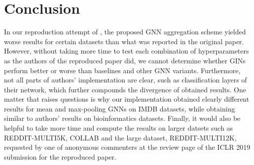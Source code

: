 \documentclass{article} %
\begin{document}
\section{Conclusion}
In our reproduction attempt of \cite{ThePaper}, the proposed GNN aggregation scheme yielded worse results for certain datasets than what was reported in the original paper. However, without taking more time to test each combination of hyperparameters as the authors of the reproduced paper did, we cannot determine whether GINs perform better or worse than baselines and other GNN variants. Furthermore, not all parts of authors' implementation are clear, such as classification layers of their network, which further compounds the divergence of obtained results. One matter that raises questions is why our implementation obtained clearly different results for mean and max-pooling GNNs on IMDB datasets, while obtaining similar to authors' results on bioinformatics datasets. Finally, it would also be helpful to take more time and compute the results on larger datsets such as REDDIT-MULTI5K, COLLAB and the large dataset, REDDIT-MULTI12K, requested by one of anonymous commenters at the review page of the ICLR 2019 submission for the reproduced paper.




\end{document}
